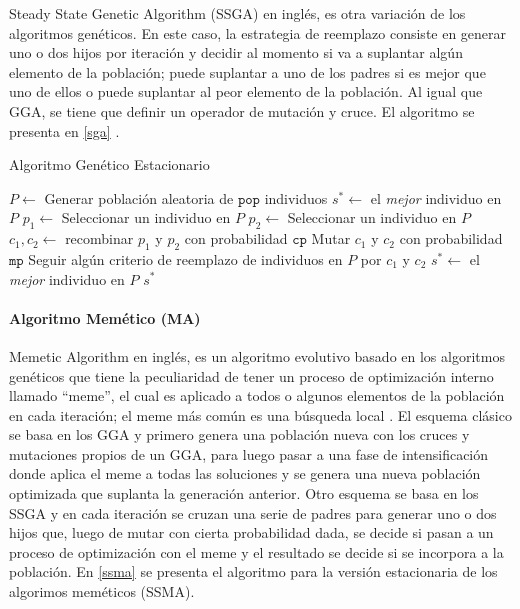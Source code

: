 Steady State Genetic Algorithm (SSGA) en inglés, es otra variación de los algoritmos genéticos. En este caso, la estrategia de reemplazo consiste en generar uno o dos hijos por iteración y decidir al momento si va a suplantar algún elemento de la población; puede suplantar a uno de los padres si es mejor que uno de ellos o puede suplantar al peor elemento de la población. Al igual que GGA, se tiene que definir un operador de mutación y cruce. El algoritmo se presenta en \ref{sga} \cite{flores2014metaheuristics}.

\begin{algorithm}
\caption{Algoritmo Genético Estacionario}
\label{sga}
\begin{algorithmic}[1]


\State $P \gets$ Generar población aleatoria de $\texttt{pop}$ individuos
\State $s^* \gets $ el \emph{mejor} individuo en $P$
	\State $p_1 \gets$ Seleccionar un individuo en $P$
	\State $p_2 \gets$ Seleccionar un individuo en $P$
	\State $c_1, c_2 \gets $ recombinar $p_1$ y $p_2$ con probabilidad $\texttt{cp}$
	\State Mutar $c_1$ y $c_2$ con probabilidad $\texttt{mp}$
	\State Seguir algún criterio de reemplazo de individuos en $P$ por $c_1$ y $c_2$
		\State $s^* \gets$ el \emph{mejor} individuo en $P$
	\EndIf
\EndWhile
\State \Return $s^*$

\end{algorithmic}
\end{algorithm}

\paragraph{Algoritmo Memético (MA)}

Memetic Algorithm en inglés, es un algoritmo evolutivo basado en los algoritmos genéticos que tiene la peculiaridad de tener un proceso de optimización interno llamado ``meme'', el cual es aplicado a todos o algunos elementos de la población en cada iteración; el meme más común es una búsqueda local \cite{neri2012memetic}. El esquema clásico se basa en los GGA y primero genera una población nueva con los cruces y mutaciones propios de un GGA, para luego pasar a una fase de intensificación donde aplica el meme a todas las soluciones y se genera una nueva población optimizada que suplanta la generación anterior. Otro esquema se basa en los SSGA y en cada iteración se cruzan una serie de padres para generar uno o dos hijos que, luego de mutar con cierta probabilidad dada, se decide si pasan a un proceso de optimización con el meme y el resultado se decide si se incorpora a la población.  En \ref{ssma} se presenta el algoritmo para la versión estacionaria de los algorimos meméticos (SSMA).

